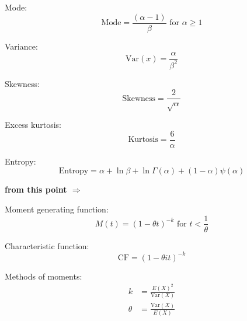 \documentclass[12pt]{article}
\begin{document}
Mode:
\begin{equation}\label{eq:gamma-mode-2}
	\text{Mode} = \frac{(\alpha-1)}{\beta}\text{ for }\alpha \geq 1
\end{equation}

Variance:
\begin{equation}\label{eq:gamma-variance-2}
	\text{Var}(x) = \frac{\alpha}{\beta^2}
\end{equation}

Skewness:
\begin{equation}\label{eq:gamma-skewness-2}
	\text{Skewness} = \frac{2}{\sqrt{\alpha}}
\end{equation}

Excess kurtosis:
\begin{equation}\label{eq:gamma-kurtosis-2}
	\text{Kurtosis} = \frac{6}{\alpha}
\end{equation}

Entropy:
\begin{equation}\label{eq:gamma-entropy-2}
	\text{Entropy} = \alpha + \ln{\beta} + \ln{\Gamma(\alpha)} + (1-\alpha)\psi(\alpha)
\end{equation}

\incomplete\textbf{ from this point $\Rightarrow$}

Moment generating function:
\begin{equation}\label{eq:gamma-mgf-2}
	M(t) = (1-\theta t)^{-k}\text{ for }t < \frac{1}{\theta} 
\end{equation}

Characteristic function:
\begin{equation}\label{eq:gamma-cf-2}
	\text{CF} = (1-\theta it)^{-k}
\end{equation}

Methods of moments:
\begin{equation}\label{eq:gamma-mom-2}
	\begin{split}
		k		&=	\frac{E(X)^2}{\text{Var}(X)}\\
		\theta	&=	\frac{\text{Var}(X)}{E(X)}
	\end{split}
\end{equation}

\pagebreak

\begin{appendix}
	\listoffigures
	\listoftables
\end{appendix}

\pagebreak{}\printbibliography[heading=bibintoc,title={References}]
\end{document}
